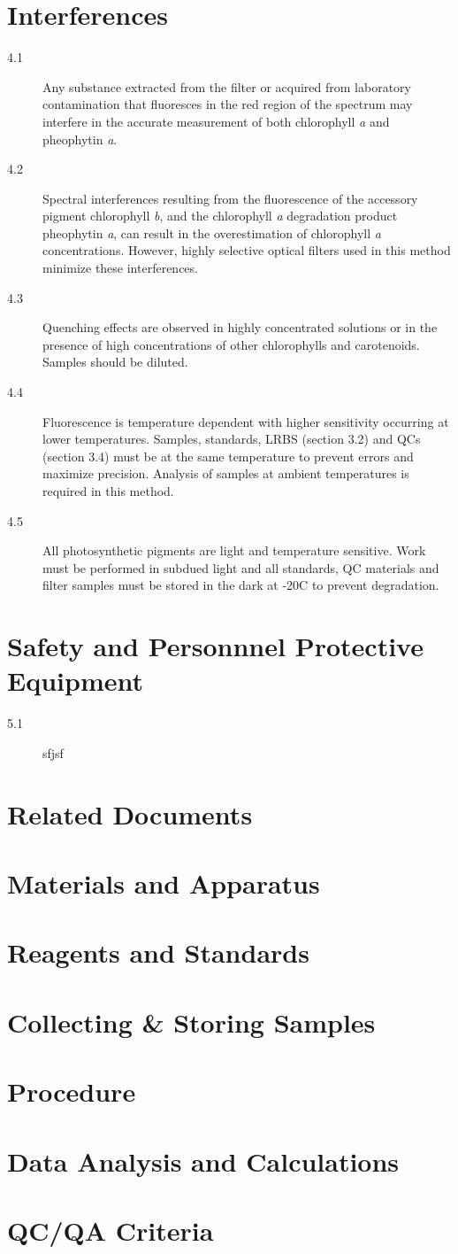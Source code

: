 \documentclass{article}
\begin{document}
\section{Interferences}
\begin{description}
\item[4.1] Any substance extracted from the filter or acquired from laboratory contamination that fluoresces in the red region of the spectrum may interfere in the accurate measurement of both chlorophyll \textit{a} and pheophytin \textit{a}.
\item[4.2] Spectral interferences resulting from the fluorescence of the accessory pigment chlorophyll \textit{b}, and the chlorophyll \textit{a} degradation product pheophytin \textit{a}, can result in the overestimation of chlorophyll \textit{a} concentrations. However, highly selective optical filters used in this method minimize these interferences. 
\item[4.3] Quenching effects are observed in highly concentrated solutions or in the presence of high concentrations of other chlorophylls and carotenoids. Samples should be diluted. 
\item[4.4] Fluorescence is temperature dependent with higher sensitivity occurring at lower temperatures. Samples, standards, LRBS (section 3.2) and QCs (section 3.4) must be at the same temperature to prevent errors and maximize precision. Analysis of samples at ambient temperatures is required in this method. 
\item[4.5] All photosynthetic pigments are light and temperature sensitive. Work must be performed in subdued light and all standards, QC materials and filter samples must be stored in the dark at -20\degree C to prevent degradation.
\end{description}

\section{Safety and Personnnel Protective Equipment}
\begin{description}
\item[5.1] sfjsf
\end{description}
\section{Related Documents}
\section{Materials and Apparatus}
\section{Reagents and Standards}
\section{Collecting \& Storing Samples}
\section{Procedure}
\section{Data Analysis and Calculations}
\section{QC/QA Criteria}
\end{document}
